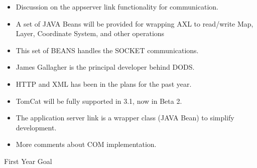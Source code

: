 \begin{itemize}
\item Discussion on the appserver link functionality for communication.
\item A set of JAVA Beans will be provided for wrapping AXL to read/write Map, Layer, 
Coordinate System, and other operations
\item This set of BEANS handles the SOCKET communications.
\item James Gallagher is the principal developer behind DODS.
\item HTTP and XML has been in the plans for the past year.
\item TomCat will be fully supported in 3.1, now in Beta 2.
\item The application server link is a wrapper class (JAVA Bean) to simplify development.
\item More comments about COM implementation.
\end{itemize}

        First Year Goal

